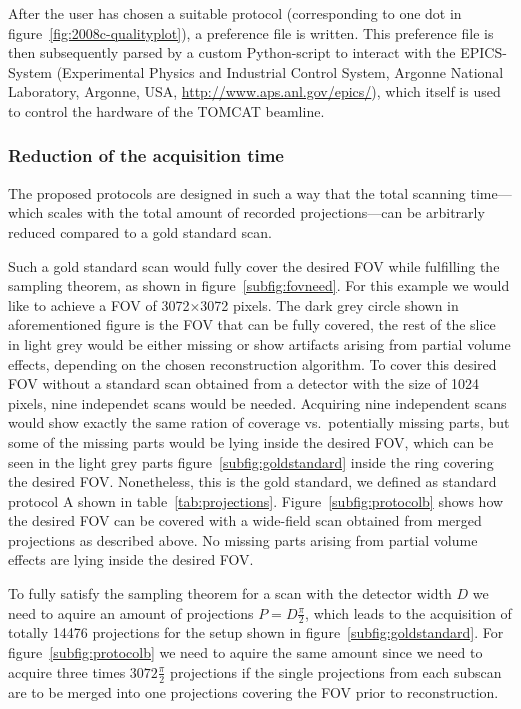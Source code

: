 After the user has chosen a suitable protocol (corresponding to one dot in figure~\ref{fig:2008c-qualityplot}), a preference file is written. This preference file is then subsequently parsed by a custom Python-script to interact with the EPICS-System (Experimental Physics and Industrial Control System, Argonne National Laboratory, Argonne, USA, \url{http://www.aps.anl.gov/epics/}), which itself is used to control the hardware of the TOMCAT beamline.

\subsubsection{Reduction of the acquisition time}
The proposed protocols are designed in such a way that the total scanning time---which scales with the total amount of recorded projections---can be arbitrarly reduced compared to a gold standard scan.

\cbstart
Such a gold standard scan would fully cover the desired FOV while fulfilling the sampling theorem, as shown in figure~\ref{subfig:fovneed}. For this example we would like to achieve a FOV of 3072$\times$3072 pixels. The dark grey circle shown in aforementioned figure is the FOV that can be fully covered, the rest of the slice in light grey would be either missing or show artifacts arising from partial volume effects, depending on the chosen reconstruction algorithm. To cover this desired FOV without a standard scan obtained from a detector with the size of 1024 pixels, nine independet scans would be needed. Acquiring nine independent scans would show exactly the same ration of coverage vs.\ potentially missing parts, but some of the missing parts would be lying inside the desired FOV, which can be seen in the light grey parts figure~\ref{subfig:goldstandard} inside the ring covering the desired FOV. Nonetheless, this is the gold standard, we defined as standard protocol A shown in table~\ref{tab:projections}. Figure~\ref{subfig:protocolb} shows how the desired FOV can be covered with a wide-field scan obtained from merged projections as described above. No missing parts arising from partial volume effects are lying inside the desired FOV.

To fully satisfy the sampling theorem for a scan with the detector width $D$ we need to aquire an amount of projections $P=D\frac{\pi}{2}$, which leads to the acquisition of totally 14476 projections for the setup shown in figure~\ref{subfig:goldstandard}. For figure~\ref{subfig:protocolb} we need to aquire the same amount since we need to acquire three times $3072\frac{\pi}{2}$ projections if the single projections from each subscan are to be merged into one projections covering the FOV prior to reconstruction.
\cbend

